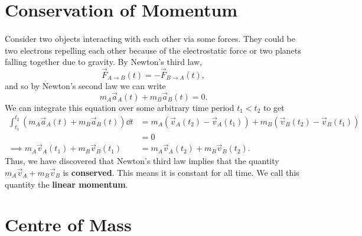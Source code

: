\documentclass[../classical_mechanics.tex]{subfiles}
\begin{document}
    \section{Conservation of Momentum}\label{sec:conservation-of-momentum}
        \paragraph{}
        Consider two objects interacting with each other via some forces.
        They could be two electrons repelling each other because of the electrostatic force or two planets falling together due to gravity.
        By Newton's third law,
        \begin{equation}
            \vec{F}_{A\to B}(t)=-\vec{F}_{B\to A}(t),
        \end{equation}
        and so by Newton's second law we can write
        \begin{equation}\label{eq-COM-acc}
            m_A\vec{a}_A(t)+m_B\vec{a}_B(t)=0.
        \end{equation}
        We can integrate this equation over some arbitrary time period $t_1<t_2$ to get
        \begin{align}
            \int_{t_1}^{t_2}\left(m_A\vec{a}_A(t)+m_B\vec{a}_B(t)\right)\dd{t}&=m_A\left(\vec{v}_A(t_2)-\vec{v}_A(t_1)\right)+m_B\left(\vec{v}_B(t_2)-\vec{v}_B(t_1)\right)\\
            &=0\\
            \implies m_A\vec{v}_A(t_1)+m_B\vec{v}_B(t_1)&=m_A\vec{v}_A(t_2)+m_B\vec{v}_B(t_2).
        \end{align}
        Thus, we have discovered that Newton's third law implies that the quantity $m_A\vec{v}_A+m_B\vec{v}_B$ is \textbf{conserved}.
        This means it is constant for all time. We call this quantity the \textbf{linear momentum}.

    \section{Centre of Mass}\label{sec:centre-of-mass}
\end{document}
